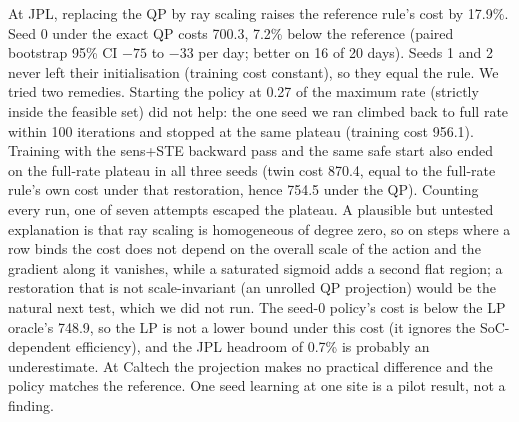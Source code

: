 \documentclass[10pt]{article}
\begin{document}
At JPL, replacing the QP by ray scaling raises the reference rule's cost by 17.9\%. Seed 0 under the exact QP costs 700.3, 7.2\% below the reference (paired bootstrap 95\% CI $-75$ to $-33$ per day; better on 16 of 20 days). Seeds 1 and 2 never left their initialisation (training cost constant), so they equal the rule. We tried two remedies. Starting the policy at 0.27 of the maximum rate (strictly inside the feasible set) did not help: the one seed we ran climbed back to full rate within 100 iterations and stopped at the same plateau (training cost 956.1). Training with the sens+STE backward pass and the same safe start also ended on the full-rate plateau in all three seeds (twin cost 870.4, equal to the full-rate rule's own cost under that restoration, hence 754.5 under the QP). Counting every run, one of seven attempts escaped the plateau. A plausible but untested explanation is that ray scaling is homogeneous of degree zero, so on steps where a row binds the cost does not depend on the overall scale of the action and the gradient along it vanishes, while a saturated sigmoid adds a second flat region; a restoration that is not scale-invariant (an unrolled QP projection) would be the natural next test, which we did not run. The seed-0 policy's cost is below the LP oracle's 748.9, so the LP is not a lower bound under this cost (it ignores the SoC-dependent efficiency), and the JPL headroom of 0.7\% is probably an underestimate. At Caltech the projection makes no practical difference and the policy matches the reference. One seed learning at one site is a pilot result, not a finding.
\end{document}
